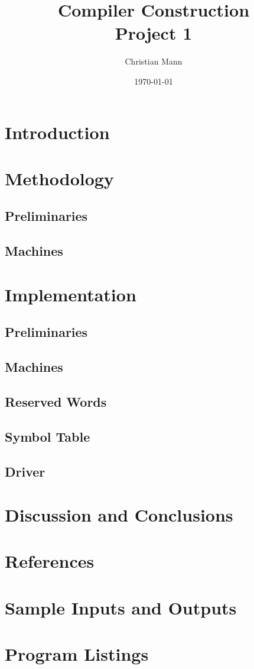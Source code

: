 \documentclass[titlepage]{article}
\author{Christian Mann}
\title{Compiler Construction \\ Project 1}
\date{\today}
\begin{document}
	\maketitle
	\tableofcontents

	\section{Introduction}
	\section{Methodology}
		\subsection{Preliminaries}
		\subsection{Machines}
	\section{Implementation}
		\subsection{Preliminaries}
		\subsection{Machines}
		\subsection{Reserved Words}
		\subsection{Symbol Table}
		\subsection{Driver}
	\section{Discussion and Conclusions}
	\section{References}
	\appendix
	\section{Sample Inputs and Outputs}
	\section{Program Listings}
\end{document}
